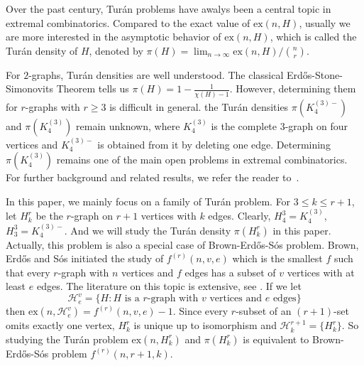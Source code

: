 \documentclass[12pt,a4paper]{article}
\numberwithin{equation}{section}
\theoremstyle{definition}
\theoremstyle{remark}
\begin{document}
Over the past century, Tur\'an problems have awalys been a central topic in extremal combinatorics. 
Compared to the exact value of $\mathrm{ex}(n,H)$,  usually we are more interested in the asymptotic behavior of $\mathrm{ex}(n,H)$, which is called the Tur\'an density of $H$, denoted by
$\pi(H)=\lim_{n\to\infty} \mathrm{ex}(n,H)/\binom {n}{r}.$


For $2$-graphs, Tur\'an densities are well understood. The classical Erd\H{o}s-Stone-Simonovits Theorem \cite{Er, stone} tells us $\pi(H)=1-\frac{1}{\chi(H)-1}$. However,  determining them for $r$-graphs with $r\ge 3$ is difficult in general.
the Tur\'an densities $\pi(K_4^{(3)-})$ and $\pi(K_4^{(3)})$  remain unknown, where $K_4^{(3)}$ is the complete $3$-graph on four vertices and $K_4^{(3)-}$ is obtained from it by deleting one edge.
Determining $\pi(K_4^{(3)})$ remains one of the main open problems in extremal combinatorics.
For further background and related results, we refer the reader to~\cite{deCaen1994,Furedi1991,Keevash2011,Sidorenko1995}.

In this paper, we mainly focus on a family of Tur\'an problem. For $3\le k\le r+1$, let $H_k^r$ be the $r$-graph on $r+1$ vertices with $k$ edges. Clearly, $H_4^3=K_4^{(3)}$, $H_3^3=K_4^{(3)-}$. And we will study the Tur\'an density $\pi(H_k^r)$ in this paper. Actually, this problem  is also a special case of Brown-Erd\H{o}s-S\'os problem. Brown, Erd\H{o}s and S\'os \cite{BES} initiated the study of $f^{(r)}(n,v,e)$ which is the smallest $f$ such that every $r$-graph with $n$ vertices and $f$ edges has a subset of $v$ vertices with at least $e$ edges. The literature on this topic is extensive, see \cite{Alon,Postle,Glock,Glock2,Wang}. If we let
$$\mathcal{H}_e^v=\{H:\text{$H$ is a $r$-graph with $v$ vertices and $e$ edges}\}$$
then $\mathrm{ex}(n,\mathcal{H}_e^v)=f^{(r)}(n,v,e)-1$. Since every $r$-subset of an $(r+1)$-set omits exactly one vertex,  $H_k^r$ is unique up to isomorphism and $\mathcal{H}_k^{r+1}=\{H_k^r\}$. So studying the Tur\'an problem $\mathrm{ex}(n,H_k^r)$ and $\pi(H_k^r)$ is equivalent to Brown-Erd\H{o}s-S\'os problem $f^{(r)}(n,r+1,k)$.
\end{document}
